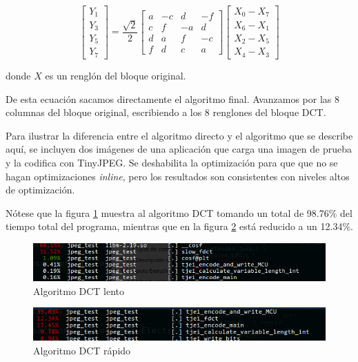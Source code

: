 {\begin{equation*}
    \begin{bmatrix}
        Y_1 \\
        Y_3 \\
        Y_5 \\
        Y_7
    \end{bmatrix}
    = \frac{\sqrt{2}}{2} \begin{bmatrix}
        a & -c & d & -f  \\
        c & f & -a & d  \\
        d & a & f & -c  \\
        f & d & c & a
        \end {bmatrix} \begin {bmatrix}
        X_0 - X_7 \\
        X_6 - X_1 \\
        X_2 - X_5 \\
        X_4 - X_3
        \end {bmatrix}
\end{equation*}

donde $X$ es un renglón del bloque original.

De esta ecuación sacamos directamente el algoritmo final. Avanzamos por las 8 columnas del bloque original, escribiendo a los 8 renglones del bloque DCT.

Para ilustrar la diferencia entre el algoritmo directo y el algoritmo que se describe aquí, se incluyen dos imágenes de una aplicación que carga una imagen de prueba y la codifica con TinyJPEG. Se deshabilita la optimización para que que no se hagan optimizaciones \emph{inline}, pero los resultados son consistentes con niveles altos de optimización.

Nótese que la figura \ref{fig:pre_dct} muestra al algoritmo DCT tomando un total de 98.76\% del tiempo total del programa, mientras que en la figura \ref{fig:post_dct} está reducido a un 12.34\%.

\begin{figure}[h]
    \includegraphics[width=1.0\textwidth]{pre_dct}
    \caption{Algoritmo DCT lento}
    \label{fig:pre_dct}
\end{figure}

\begin{figure}[h]
    \includegraphics[width=1.0\textwidth]{post_dct}
    \caption{Algoritmo DCT rápido}
    \label{fig:post_dct}
\end{figure}


}
